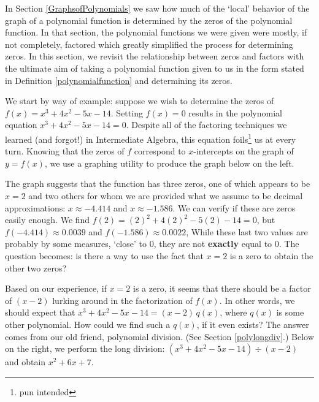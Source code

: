 \documentclass{ximera}
\begin{document}
	\author{Stitz-Zeager}




\setcounter{footnote}{0}

\label{Polydivision}


In Section \ref{GraphsofPolynomials} we saw how much of the `local' behavior of the graph of a polynomial function is  determined by the zeros of the polynomial function.  In that section, the polynomial functions we were given were mostly, if not completely, factored which greatly simplified the process for determining zeros.  In this section, we revisit the relationship between zeros and factors with the ultimate aim of taking a polynomial function given to us in the form stated in Definition \ref{polynomialfunction}  and determining its zeros. 

\medskip

 We start by way of example:  suppose we wish to determine the zeros of  $f(x) = x^3 + 4x^2-5x-14$.  Setting $f(x)=0$ results in the polynomial equation $x^3 + 4x^2-5x-14=0$.   Despite all of the factoring techniques we learned (and forgot!) in Intermediate Algebra, this equation foils\footnote{pun intended} us at every turn. Knowing that the zeros of $f$ correspond to $x$-intercepts on the graph of $y=f(x)$, we use a graphing utility to produce the graph below on the left.  
 
 \medskip
 
 The graph suggests that the function has three zeros, one of which appears to be $x=2$ and two others for whom we are provided what we assume to be decimal approximations:  $x \approx -4.414$ and $x \approx -1.586$.    We can verify if these are zeros easily enough.   We find  $f(2) =(2)^2 + 4(2)^2-5(2)-14 = 0$,  but  $f(-4.414) \approx 0.0039$ and $f(-1.586) \approx 0.0022$,  While these last two values are probably by some measures,  `close' to $0$, they are not \textbf{exactly} equal to $0$.  The question becomes:  is there a way to use the fact that $x=2$ is a zero to obtain the other two zeros?  
 
 \medskip
 
 Based on our experience, if $x=2$ is a zero, it seems that there should be a factor of $(x-2)$ lurking around in the factorization of $f(x)$.  In other words, we should expect that $x^3 + 4x^2-5x-14=(x-2) \, q(x)$, where $q(x)$ is some other polynomial.  How could we find such a $q(x)$, if it even exists?  The answer comes from our old friend, polynomial division. (See Section \ref{polylongdiv}.) Below on the right, we perform the long division:  $(x^3 + 4x^2-5x-14) \div (x-2)$ and obtain $x^2+6x+7$.
 
\end{document}

